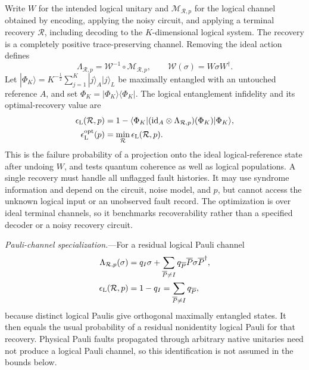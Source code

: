 \documentclass[aps,prl,reprint,notitlepage,nofootinbib,nobibnotes]{revtex4-2}
\begin{document}
Write $W$ for the intended logical unitary and $\mathcal M_{\mathcal R,p}$ for the logical channel
obtained by encoding, applying the noisy circuit, and applying a terminal recovery $\mathcal R$,
including decoding to the $K$-dimensional logical system. The recovery is a completely positive
trace-preserving channel. Removing the ideal action defines
\begin{equation}\label{eq:logical-residual-channel}
 \Lambda_{\mathcal R,p}
 =\mathcal W^{-1}\circ\mathcal M_{\mathcal R,p},
 \qquad \mathcal W(\sigma)=W\sigma W^\dagger .
\end{equation}
Let $|\Phi_K\rangle=K^{-\frac{1}{2}}\sum_{j=1}^K|j\rangle_A|j\rangle_L$ be maximally entangled with
an untouched reference $A$, and set $\Phi_K=|\Phi_K\rangle\langle\Phi_K|$. The logical entanglement
infidelity and its optimal-recovery value are~\cite{Schumacher}
\begin{equation}\label{eq:logical-entanglement-infidelity}
 \begin{aligned}
 \epsilon_{\rm L}(\mathcal R,p)
 &=1-\langle\Phi_K|
   (\mathrm{id}_A\otimes\Lambda_{\mathcal R,p})(\Phi_K)
   |\Phi_K\rangle,\\
 \epsilon_{\rm L}^{\rm opt}(p)
 &=\min_{\mathcal R}\epsilon_{\rm L}(\mathcal R,p).
 \end{aligned}
\end{equation}
This is the failure probability of a projection onto the ideal logical-reference state after
undoing $W$, and tests quantum coherence as well as logical populations. A single recovery must
handle all unflagged fault histories. It may use syndrome information and depend on the circuit,
noise model, and $p$, but cannot access the unknown logical input or an unobserved fault record.
The optimization is over ideal terminal channels, so it benchmarks recoverability rather than a
specified decoder or a noisy recovery circuit.

\emph{Pauli-channel specialization.}---For a residual logical Pauli channel
\begin{equation}\label{eq:logical-pauli-error-rate}
 \begin{aligned}
 \Lambda_{\mathcal R,p}(\sigma)
 &=q_I\sigma+\sum_{\overline P\ne I}
      q_{\overline P}\overline P\sigma\overline P^\dagger,\\
 \epsilon_{\rm L}(\mathcal R,p)
 &=1-q_I=\sum_{\overline P\ne I}q_{\overline P},
 \end{aligned}
\end{equation}
because distinct logical Paulis give orthogonal maximally entangled states. It then equals the
usual probability of a residual nonidentity logical Pauli for that recovery. Physical Pauli faults
propagated through arbitrary native unitaries need not produce a logical Pauli channel, so this
identification is not assumed in the bounds below. 
\end{document}
